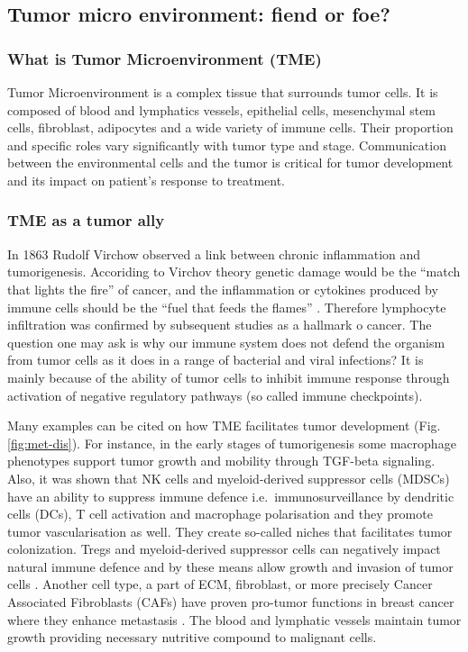 \documentclass[12pt,]{book}
\theoremstyle{definition}
\theoremstyle{definition}
\theoremstyle{definition}
\theoremstyle{remark}
\begin{document}
\hypertarget{tumor-micro-environment-fiend-or-foe}{%
\subsection{Tumor micro environment: fiend or
foe?}\label{tumor-micro-environment-fiend-or-foe}}

\hypertarget{what-is-tumor-microenvironment-tme}{%
\subsubsection{What is Tumor Microenvironment
(TME)}\label{what-is-tumor-microenvironment-tme}}

Tumor Microenvironment is a complex tissue that surrounds tumor cells.
It is composed of blood and lymphatics vessels, epithelial cells,
mesenchymal stem cells, fibroblast, adipocytes and a wide variety of
immune cells. Their proportion and specific roles vary significantly
with tumor type and stage. Communication between the environmental cells
and the tumor is critical for tumor development and its impact on
patient's response to treatment.

\hypertarget{tme-as-a-tumor-ally}{%
\subsubsection{TME as a tumor ally}\label{tme-as-a-tumor-ally}}

In 1863 Rudolf Virchow observed a link between chronic inflammation and
tumorigenesis. Accoriding to Virchov theory genetic damage would be the
``match that lights the fire'' of cancer, and the inflammation or
cytokines produced by immune cells should be the ``fuel that feeds the
flames'' \citep{Balkwill2001}. Therefore lymphocyte infiltration was
confirmed by subsequent studies as a hallmark o cancer. The question one
may ask is why our immune system does not defend the organism from tumor
cells as it does in a range of bacterial and viral infections? It is
mainly because of the ability of tumor cells to inhibit immune response
through activation of negative regulatory pathways (so called immune
checkpoints).

Many examples can be cited on how TME facilitates tumor development
(Fig. \ref{fig:met-dis}). For instance, in the early stages of
tumorigenesis some macrophage phenotypes support tumor growth and
mobility through TGF-beta signaling. Also, it was shown that NK cells
and myeloid-derived suppressor cells (MDSCs) have an ability to suppress
immune defence i.e.~immunosurveillance by dendritic cells (DCs), T cell
activation and macrophage polarisation and they promote tumor
vascularisation as well. \citep{Talmadge2013, Gabrilovich2012} They
create so-called niches that facilitates tumor colonization. Tregs and
myeloid-derived suppressor cells can negatively impact natural immune
defence and by these means allow growth and invasion of tumor cells
\citep{Taube2017a}. Another cell type, a part of ECM, fibroblast, or
more precisely Cancer Associated Fibroblasts (CAFs) have proven
pro-tumor functions in breast cancer where they enhance metastasis
\citep{Dumont2013}. The blood and lymphatic vessels maintain tumor
growth providing necessary nutritive compound to malignant cells.
\end{document}
